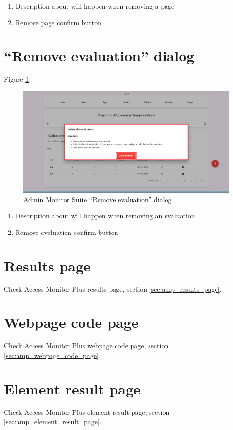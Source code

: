 \begin{enumerate}
    \item Description about will happen when removing a page
    \item Remove page confirm button
\end{enumerate}

\clearpage

\section{``Remove evaluation'' dialog}
\label{sec:admin_remove_evaluation_dialog}

Figure \ref{fig:admin_remove_evaluation_dialog}.

\begin{figure}[H]
    \centering
    \includegraphics[width=\linewidth]{lib/images/admin/admin_remove_evaluation_dialog.png}
    \caption{Admin Monitor Suite ``Remove evaluation'' dialog}
    \label{fig:admin_remove_evaluation_dialog}
\end{figure}

\begin{enumerate}
    \item Description about will happen when removing an evaluation
    \item Remove evaluation confirm button
\end{enumerate}

\section{Results page}

Check Access Monitor Plus results page, section \ref{sec:amp_results_page}.

\section{Webpage code page}

Check Access Monitor Plus webpage code page, section \ref{sec:amp_webpage_code_page}.

\section{Element result page}

Check Access Monitor Plus element result page, section \ref{sec:amp_element_result_page}.